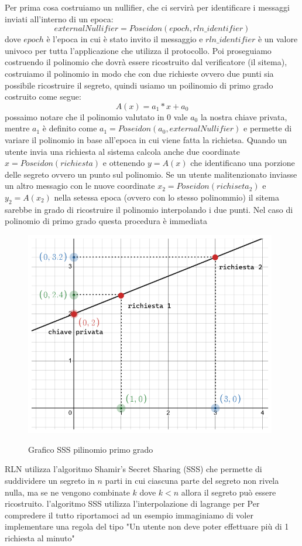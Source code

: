 Per prima cosa costruiamo un nullifier, che ci servirà per identificare i messaggi inviati all'interno di un epoca:
$$externalNullifier = Poseidon(epoch,rln\_identifier)$$
dove $epoch$ è l'epoca in cui è stato invito il messaggio e $rln\_identifier$ è un valore univoco per tutta l'applicazione che utilizza il protocollo. Poi proseguiamo costruendo il polinomio che dovrà essere ricostruito dal verificatore (il sitema), costruiamo il polinomio in modo che con due richieste ovvero due punti sia possibile ricostruire il segreto, quindi usiamo un poilinomio di primo grado costruito come segue:
$$ A(x) = a_1 * x + a_0$$
possaimo notare che il polinomio valutato in 0 vale $a_0$ la nostra chiave privata, mentre $a_1$ è definito come $a_1 = Poseidon(a_0, externalNullifier)$ e permette di variare il polinomio in base all'epoca in cui viene fatta la richietsa. Quando un utente invia una richiesta al sistema calcola anche due coordinate $x = Poseidon(richiesta)$ e ottenendo $y=A(x)$ che identificano una porzione delle segreto ovvero un punto sul polinomio. Se un utente malitenzionato inviasse un altro messagio con le nuove coordinate $x_2 = Poseidon(richiseta_2)$ e $y_2=A(x_2)$ nella setessa epoca (ovvero con lo stesso polinommio) il sitema sarebbe in grado di ricostruire il polinomio interpolando i due punti. Nel caso di polinomio di primo grado questa procedura è immediata
\begin{figure}[H]
    \centering
    \includegraphics[width=11cm]{./chapters/2.rln-protocol/images/6.a_0_interpolation.png}
    \label{fig:a_0_interpolation}
    \captionsetup{justification=centering}
    \caption{Grafico SSS pilinomio primo grado}
\end{figure}
RLN utilizza l'algoritmo Shamir's Secret Sharing (SSS) che permette di suddividere un segreto in $n$ parti in cui ciascuna parte del segreto non rivela nulla, ma se ne vengono combinate $k$ dove $k < n$ allora il segreto può essere ricostruito. l'algoritmo SSS utilizza l'interpolazione di lagrange per  Per compredere il tutto riportamoci ad un esempio immaginiamo di voler implementare una regola del tipo "Un utente non deve poter effettuare più di 1 richiesta al minuto"